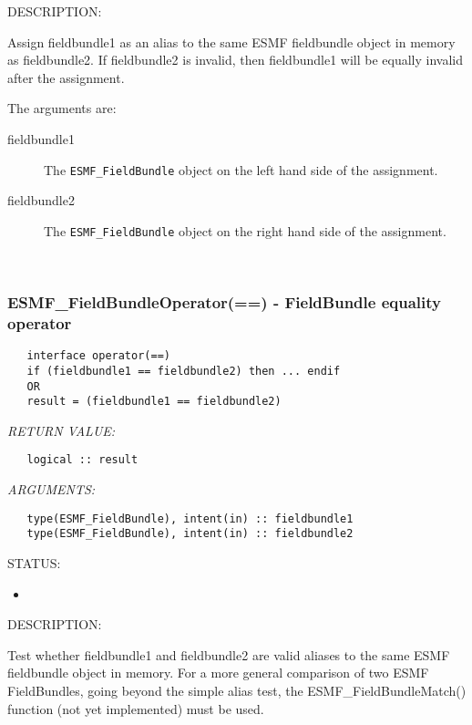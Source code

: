 {\sf DESCRIPTION:\\ }


   Assign fieldbundle1 as an alias to the same ESMF fieldbundle object in memory
   as fieldbundle2. If fieldbundle2 is invalid, then fieldbundle1 will be equally invalid after
   the assignment.
  
   The arguments are:
   \begin{description}
   \item[fieldbundle1]
   The {\tt ESMF\_FieldBundle} object on the left hand side of the assignment.
   \item[fieldbundle2]
   The {\tt ESMF\_FieldBundle} object on the right hand side of the assignment.
   \end{description}
   
 
\mbox{}\hrulefill\ 
 
\subsubsection [ESMF\_FieldBundleOperator(==)] {ESMF\_FieldBundleOperator(==) - FieldBundle equality operator}


  
\begin{verbatim}   interface operator(==)
   if (fieldbundle1 == fieldbundle2) then ... endif
   OR
   result = (fieldbundle1 == fieldbundle2)\end{verbatim}{\em RETURN VALUE:}
\begin{verbatim}   logical :: result\end{verbatim}{\em ARGUMENTS:}
\begin{verbatim}   type(ESMF_FieldBundle), intent(in) :: fieldbundle1
   type(ESMF_FieldBundle), intent(in) :: fieldbundle2\end{verbatim}
{\sf STATUS:}
   \begin{itemize}
   \item{}
   \end{itemize}
  
{\sf DESCRIPTION:\\ }


   \begin{sloppypar}
   Test whether fieldbundle1 and fieldbundle2 are valid aliases to the same ESMF
   fieldbundle object in memory. For a more general comparison of two ESMF FieldBundles,
   going beyond the simple alias test, the ESMF\_FieldBundleMatch() function (not yet
   implemented) must be used.
   \end{sloppypar}
  

